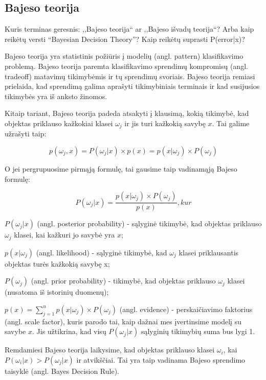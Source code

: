 \subsection{Bajeso teorija}

Kuris terminas geresnis: ,,Bajeso teorija`` ar ,,Bajeso išvadų teorija``?
Arba kaip reikėtų versti ``Bayesian Decision Theory''?
Kaip reikėtų suprasti P(error|x)?

Bajeso teorija\cite{duda2001pattern} yra statistinis požiūris į modelių (angl.
pattern) klasifikavimo problemą. Bajeso teorija paremta klasifikavimo sprendimų kompromisų (angl.
tradeoff) matavimų tikimybėmis ir tų sprendimų svoriais. Bajeso teorija remiasi
prielaida, kad sprendimą galima aprašyti tikimybiniais terminais ir kad
susijusios tikimybės yra iš anksto žinomos.

Kitaip tariant, Bajeso teorija padeda atsakyti į klausimą, kokią tikimybė, kad
objektas priklauso kažkokiai klasei $\omega_j$ ir jis turi kažkokią savybę $x$.
Tai galime užrašyti taip: 

\begin{equation}
p(\omega_j, x) = P(\omega_j | x) \times p(x) = p(x|\omega_j) \times P(\omega_j)
\end{equation}

O jei pergrupuosime pirmąją formulę, tai gausime taip vadinamąją Bajeso formulę:

\begin{equation}
P(\omega_j | x) = \frac{p(x | \omega_j) \times P(\omega_j)}{p(x)}, kur
\end{equation}

$P(\omega_j | x)$ (angl. posterior probability) - sąlyginė tikimybė,
kad objektas priklauso $\omega_j$ klasei, kai kažkuri jo savybė yra $x$;

$p(x | \omega_j)$ (angl. likelihood) - sąlyginė tikimybė, kad $\omega_j$ klasei
priklausantis objektas turės kažkokią savybę x;

$P(\omega_j)$ (angl. prior probability) - tikimybė, kad objektas priklauso
$\omega_j$ klasei (nusatoma iš istorinių duomenų);

$p(x) = \sum_{j=1}^{n} p(x | \omega_j) \times P(\omega_j)$ (angl. evidence) -
perskaičiavimo faktorius (angl. scale factor), kuris parodo tai, kaip dažnai mes
įvertinsime modelį su savybe $x$. Jis užtikrina, kad visų $P(\omega_j | x)$
sąlyginių tikimybių suma bus lygi 1.

Remdamiesi Bajeso teorija laikysime, kad objektas priklauso klasei $\omega_i$,
kai $P(\omega_i | x) > P(\omega_j | x)$ ir atvikščiai. Tai yra taip vadinama
Bajeso sprendimo taisyklė (angl. Bayes Decision Rule).
